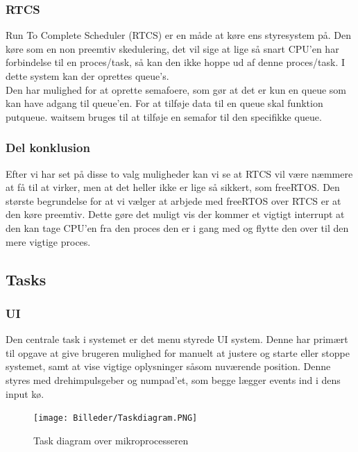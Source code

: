 \subsubsection{RTCS}

Run To Complete Scheduler (RTCS) er en måde at køre ens styresystem på. Den køre som en non preemtiv skedulering, det vil sige at lige så snart CPU'en har forbindelse til en proces/task, så kan den ikke hoppe ud af denne proces/task. I dette system kan der oprettes queue's.
\\
Den har mulighed for at oprette semafoere, som gør at det er kun en queue som kan have adgang til queue'en. For at tilføje data til en queue skal funktion put\textunderscore queue. wait\textunderscore sem bruges til at tilføje en semafor til den specifikke queue.

\subsubsection{Del konklusion}

Efter vi har set på disse to valg muligheder kan vi se at RTCS vil være næmmere at få til at virker, men at det heller ikke er lige så sikkert, som freeRTOS. Den største begrundelse for at vi vælger at arbjede med freeRTOS over RTCS er at den køre preemtiv. Dette gøre det muligt vis der kommer et vigtigt interrupt at den kan tage CPU'en fra den proces den er i gang med og flytte den over til den mere vigtige proces.

\subsection{Tasks}

\subsubsection{UI}

Den centrale task i systemet er det menu styrede UI system. Denne har primært til opgave at give brugeren mulighed for manuelt at justere og starte eller stoppe systemet, samt at vise vigtige oplysninger såsom nuværende position. Denne styres med drehimpulsgeber og numpad'et, som begge lægger events ind i dens input kø.

\begin{figure}[H]
			\begin{center}
			\texttt{[image: Billeder/Taskdiagram.PNG]}
			\end{center}
			\caption{Task diagram over mikroprocesseren}
			\label{fig:Taskdiagram}
\end{figure}

